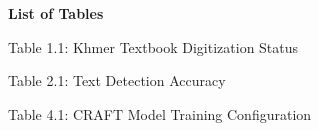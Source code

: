 \begin{adjustwidth}{0.2cm}{0.2cm}

    \begin{center}
        {\englishfont\fontsize{14pt}{21pt}\selectfont \textbf{List of Tables} \par}
    \end{center}
    \label{lot}

    \vspace{1cm}
    \setlength{\parindent}{0pt}
    \vspace{0.3cm}
    
    {\large Table 1.1: Khmer Textbook Digitization Status\dotfill\pageref{sec:textbook}\hspace{0.1cm}\par}
    
    {\large Table 2.1: Text Detection Accuracy\dotfill\pageref{tab:text_detection_accuracy}\hspace{0.1cm}\par}
    
    {\large Table 4.1: CRAFT Model Training Configuration\dotfill\pageref{tab:craft-training-config}\hspace{0.1cm}\par}

\end{adjustwidth}